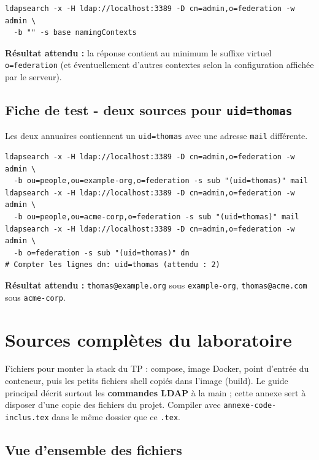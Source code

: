 \documentclass[11pt,a4paper]{report}
\begin{document}
\begin{lstlisting}[style=bashstyle]
ldapsearch -x -H ldap://localhost:3389 -D cn=admin,o=federation -w admin \
  -b "" -s base namingContexts
\end{lstlisting}

\textbf{Résultat attendu :} la réponse contient au minimum le suffixe virtuel \texttt{o=federation} (et éventuellement d'autres contextes selon la configuration affichée par le serveur).

\section{Fiche de test - deux sources pour \texttt{uid=thomas}}

Les deux annuaires contiennent un \texttt{uid=thomas} avec une adresse \texttt{mail} différente.

\begin{lstlisting}[style=bashstyle]
ldapsearch -x -H ldap://localhost:3389 -D cn=admin,o=federation -w admin \
  -b ou=people,ou=example-org,o=federation -s sub "(uid=thomas)" mail
ldapsearch -x -H ldap://localhost:3389 -D cn=admin,o=federation -w admin \
  -b ou=people,ou=acme-corp,o=federation -s sub "(uid=thomas)" mail
ldapsearch -x -H ldap://localhost:3389 -D cn=admin,o=federation -w admin \
  -b o=federation -s sub "(uid=thomas)" dn
# Compter les lignes dn: uid=thomas (attendu : 2)
\end{lstlisting}

\textbf{Résultat attendu :} \texttt{thomas@example.org} sous \texttt{example-org}, \texttt{thomas@acme.com} sous \texttt{acme-corp}.

\appendix

\chapter{Sources complètes du laboratoire}\label{ann:infra}

Fichiers pour monter la stack du TP : compose, image Docker, point d'entrée du conteneur, puis les petits fichiers shell copiés dans l'image (build). Le guide principal décrit surtout les \textbf{commandes LDAP} à la main ; cette annexe sert à disposer d'une copie des fichiers du projet. Compiler avec \texttt{annexe-code-inclus.tex} dans le même dossier que ce \texttt{.tex}.

\section{Vue d'ensemble des fichiers}
\end{document}
